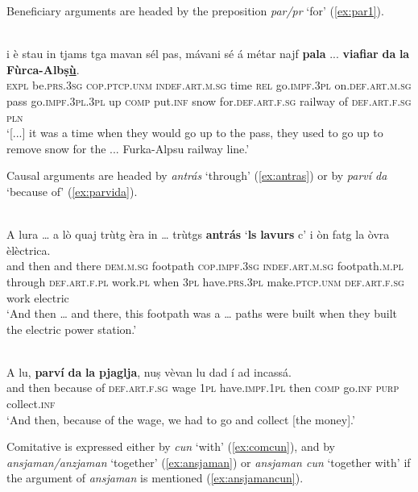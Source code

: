 Beneficiary arguments are headed by the preposition \textit{par/pr} `for' (\ref{ex:par1}).

\ea
\label{ex:par1}
\\
\gll   [...] i è stau in tjams tga mavan sél pas, mávani sé á métar najf \textbf{pala} ... \textbf{viafiar} \textbf{da} \textbf{la} \textbf{Fùrca-Albṣ\underline{ù}}. \\
{} \textsc{expl} be.\textsc{prs.3sg} \textsc{cop.ptcp.unm} \textsc{indef.art.m.sg} time \textsc{rel} go.\textsc{impf.3pl} on.\textsc{def.art.m.sg} pass go.\textsc{impf.3pl.3pl} up \textsc{comp} put.\textsc{inf} snow for.\textsc{def.art.f.sg} {} railway of \textsc{def.art.f.sg} \textsc{pln}\\
\glt `[...] it was a time when they would go up to the pass, they used to go up to remove snow for the ... Furka-Alpsu railway line.'
\z

Causal arguments are headed by \textit{antrás} `through' (\ref{ex:antras}) or by \textit{parví da} `because of' (\ref{ex:parvida}).

\ea
\label{ex:antras}
\\
\gll A lura … a lò quaj trùtg èra in … trùtgs \textbf{antrás} `\textbf{ls} \textbf{lavurs} c' i òn fatg la òvra èlèctrica.\\
and then {}  and there \textsc{dem.m.sg} footpath  \textsc{cop.impf.3sg} \textsc{indef.art.m.sg} {} footpath.\textsc{m.pl} through \textsc{def.art.f.pl}  work.\textsc{pl} when \textsc{3pl} have.\textsc{prs.3pl} make.\textsc{ptcp.unm} \textsc{def.art.f.sg} work electric \\
\glt `And then … and there, this footpath was a … paths were built when they built the electric power station.'
\z

\ea
\label{ex:parvida}
\\
\gll    A lu, \textbf{parví} \textbf{da} \textbf{la} \textbf{pjaglja}, nuṣ vèvan lu dad í ad incassá.\\
and then because of \textsc{def.art.f.sg} wage \textsc{1pl} have.\textsc{impf.1pl} then  \textsc{comp} go.\textsc{inf}  \textsc{purp}  collect.\textsc{inf} \\
\glt `And then, because of the wage, we had to go and collect [the money].'
\z

Comitative is expressed either by \textit{cun} `with' (\ref{ex:comcun}), and by \textit{ansjaman/anzjaman} `together' (\ref{ex:ansjaman}) or \textit{ansjaman cun} `together with' if the argument of \textit{ansjaman} is mentioned (\ref{ex:ansjamancun}).

